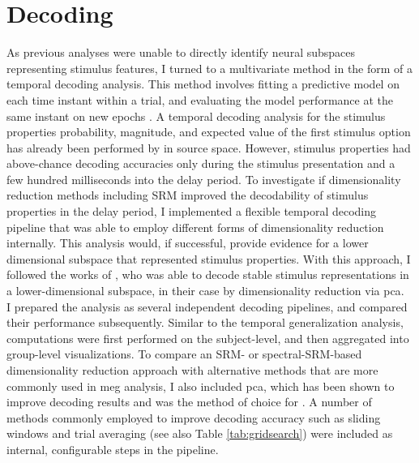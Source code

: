 \section{Decoding}
\label{decoding-analysis}

As previous analyses were unable to directly identify neural subspaces representing stimulus features, I turned to a multivariate method in the form of a temporal decoding analysis.
This method involves fitting a predictive model on each time instant within a trial, and evaluating the model performance at the same instant on new epochs \citep{king2018encoding}.
A temporal decoding analysis for the stimulus properties probability, magnitude, and expected value of the first stimulus option has already been performed by \citet{kaiserposter} in source space.
However, stimulus properties had above-chance decoding accuracies only during the stimulus presentation and a few hundred milliseconds into the delay period.
To investigate if dimensionality reduction methods including \gls{SRM} improved the decodability of stimulus properties in the delay period, I implemented a flexible temporal decoding pipeline that was able to employ different forms of dimensionality reduction internally.
This analysis would, if successful, provide evidence for a lower dimensional subspace that represented stimulus properties.
With this approach, I followed the works of \citet{murray2017stable}, who was able to decode stable stimulus representations in a lower-dimensional subspace, in their case by dimensionality reduction via \gls{pca}.\\
I prepared the analysis as several independent decoding pipelines, and compared their performance subsequently.
Similar to the temporal generalization analysis, computations were first performed on the subject-level, and then aggregated into group-level visualizations.
To compare an SRM- or spectral-SRM-based dimensionality reduction approach with alternative methods that are more commonly used in \gls{meg} analysis, I also included \gls{pca}, which has been shown to improve decoding results \citep[see e.g.,][]{grootswagers2017decoding} and was the method of choice for \citet{murray2017stable}.
A number of methods commonly employed to improve decoding accuracy such as sliding windows and trial averaging (see also Table \ref{tab:gridsearch}) were included as internal, configurable steps in the pipeline.\\
